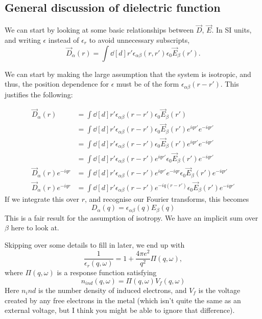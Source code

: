 \documentclass[../../main.tex]{subfiles}
\begin{document}
\subsection{General discussion of dielectric function}

We can start by looking at some basic relationships between $\vec{D}$, $\vec{E}$. In SI units, and writing $\epsilon$ instead of $\epsilon_r$ to avoid unnecessary subscripts,
\begin{equation}
	\vec{D}_\alpha(r) = \int \dd[d]{r'} \epsilon_{\alpha\beta}(r, r') \epsilon_0 \vec{E}_\beta(r').
\end{equation}

We can start by making the large assumption that the system is isotropic, and thus, the position dependence for $\epsilon$ must be of the form $\epsilon_{\alpha \beta}(r - r')$. This justifies the following:

\begin{align}
	\vec{D}_\alpha(r) &= \int \dd[d]{r'} \epsilon_{\alpha\beta}(r - r') \epsilon_0 \vec{E}_\beta(r')\\
	&= \int \dd[d]{r'} \epsilon_{\alpha\beta}(r - r') \epsilon_0 \vec{E}_\beta(r') e^{i q r'} e^{-i q r'}\\
	&= \int \dd[d]{r'} \epsilon_{\alpha\beta}(r - r') \epsilon_0 \vec{E}_\beta(r') e^{i q r'} e^{-i q r'} \\
	&= \int \dd[d]{r'} \epsilon_{\alpha\beta}(r - r') e^{i q r'} \epsilon_0 \vec{E}_\beta(r')  e^{-i q r'} \\
	\vec{D}_\alpha(r) e^{-i q r} &= \int \dd[d]{r'} \epsilon_{\alpha\beta}(r - r') e^{i q r'}  e^{-i q r} \epsilon_0 \vec{E}_\beta(r')  e^{-i q r'} \\
	\vec{D}_\alpha(r) e^{-i q r} &= \int \dd[d]{r'} \epsilon_{\alpha\beta}(r - r') e^{-iq(r - r')} \epsilon_0 \vec{E}_\beta(r')  e^{-i q r'}
\end{align}
If we integrate this over $r$, and recognise our Fourier transforms, this becomes
\begin{equation}
	D_\alpha(q) = \epsilon_{\alpha \beta}(q) E_\beta(q)
\end{equation}
This is a fair result for the assumption of isotropy. We have an implicit sum over $\beta$ here to look at.

Skipping over some details to fill in later, we end up with
\begin{equation}
	\frac{1}{\epsilon_r(q, \omega)} = 1 + \frac{4\pi e^2}{q^2} \Pi(q, \omega),
\end{equation}
where $\Pi(q, \omega)$ is a response function satisfying
\begin{equation}
	n_{ind}(q, \omega) = \Pi(q, \omega) V_f(q, \omega)
\end{equation}
Here $n_ind$ is the number density of induced electrons, and $V_f$ is the voltage created by any free electrons in the metal (which isn't quite the same as an external voltage, but I think you might be able to ignore that difference).
\end{document}
